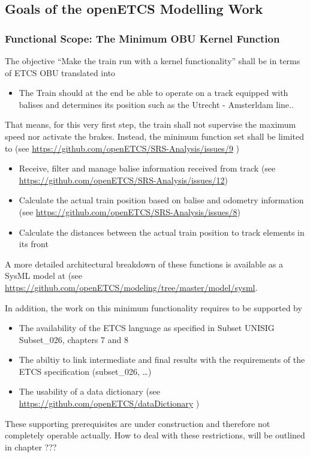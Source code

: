 \subsection{Goals of the openETCS Modelling Work}


\subsubsection{Functional Scope: The Minimum OBU Kernel Function}
\label{sec:FunctionalScopeTheMinimumOBUKernelFunction}

The objective ``Make the train run with a kernel functionality'' shall be in terms of ETCS OBU translated into 
\begin{itemize}
	\item The Train should at the end be able to operate on a track equipped with balises and determines its position such as the Utrecht - Amsterldam line..
\end{itemize}
That means, for this very first step, the train shall not supervise the maximum speed nor activate the brakes. Instead, the minimum function set shall be limited to (see \url{https://github.com/openETCS/SRS-Analysis/issues/9} ) 
\begin{itemize}
	\item Receive, filter and manage balise information received from track (see \url{https://github.com/openETCS/SRS-Analysis/issues/12})
	\item Calculate the actual train position based on balise and odometry information (see \url{https://github.com/openETCS/SRS-Analysis/issues/8})
	\item Calculate the distances between the actual train position to track elements in its front
\end{itemize}
A more detailed architectural breakdown of these functions is available as a SysML model at (see \url{https://github.com/openETCS/modeling/tree/master/model/sysml}. 

In addition, the work on this minimum functionality requires to be supported by
\begin{itemize}
	\item The availability of the ETCS language as specified in Subset UNISIG Subset\_026, chapters 7 and 8
	\item The abiltiy to link intermediate and final results with the requirements of the ETCS specification (subset\_026, \dots) 
	\item The usability of a data dictionary (see \url{https://github.com/openETCS/dataDictionary} )
\end{itemize}
These supporting prerequisites are under construction and therefore not completely operable actually. How to deal with these restrictions, will be outlined in chapter ???

